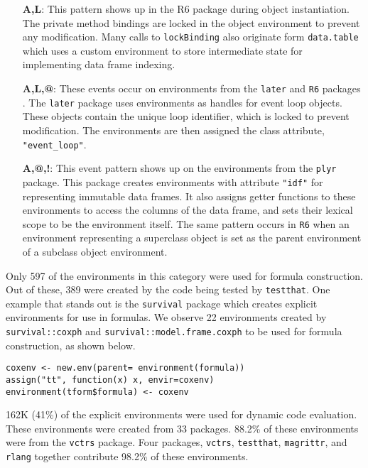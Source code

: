 \documentclass[10pt,review,sigplan,authorversion=true]{acmart}
\renewcommand{\c}[1]{\lstinline |#1|\xspace}
\begin{document}
\begin{itemize}
\item[{\bf A,L}:]
 This pattern shows up in the R6 package during object
instantiation. The private method bindings are locked in the object environment
to prevent any modification. Many calls to \c{lockBinding} also originate
form \c{data.table} which uses a custom environment to store intermediate
state for implementing data frame indexing.

\item[{\bf A,L,@}:] These events occur on environments from the \c{later} and
  \c{R6} packages . The \c{later} package uses environments as handles for event
  loop objects. These objects contain the unique loop identifier, which is
  locked to prevent modification. The environments are then assigned the class
  attribute, \c{"event_loop"}.

\item[{\bf A,@,!}:]
This event pattern shows up on the environments from the
\c{plyr} package. This package creates environments with attribute
\c{"idf"} for representing immutable data frames. It also assigns getter
functions to these environments to access the columns of the data frame, and
sets their lexical scope to be the environment itself. The same pattern occurs
in \c{R6} when an environment representing a superclass object is set as the
parent environment of a subclass object environment.
\end{itemize}

Only 597 of the environments in this category were used for formula
construction. Out of these, 389 were created by the code being tested by
\c{testthat}. One example that stands out is the \c{survival} package
which creates explicit environments for use in formulas. We observe 22
environments created by \c{survival::coxph} and
\c{survival::model.frame.coxph} to be used for formula construction, as shown
below.

\begin{lstlisting}
coxenv <- new.env(parent= environment(formula))
assign("tt", function(x) x, envir=coxenv)
environment(tform$formula) <- coxenv
\end{lstlisting}

162K (41\%) of the explicit environments were used for dynamic code evaluation.
These environments were created from 33 packages. 88.2\% of these environments
were from the \c{vctrs} package. Four packages, \c{vctrs},
\c{testthat}, \c{magrittr}, and \c{rlang} together contribute 98.2\% of
these environments.
\end{document}
